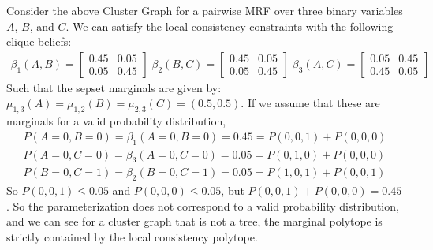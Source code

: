 \documentclass{article}
\begin{document}
\begin{enumerate}[(a)]
    Consider the above Cluster Graph for a pairwise MRF over three binary variables $A$, $B$, and $C$. We can satisfy the local consistency constraints with the following clique beliefs: 
\begin{gather*}
            \beta_{1}(A, B) =
            \begin{bmatrix}
                0.45 & 0.05\\ 0.05 & 0.45
            \end{bmatrix} \;
\beta_{2}(B, C) =
            \begin{bmatrix}
                0.45 & 0.05\\ 0.05 & 0.45
            \end{bmatrix}\;
\beta_{3}(A, C) =
            \begin{bmatrix}
                0.05 & 0.45 \\ 0.45 & 0.05
            \end{bmatrix}
    \end{gather*}
    Such that the sepset marginals are given by: $\mu_{1,3}(A) = \mu_{1,2}(B) = \mu_{2,3}(C) = (0.5, 0.5)$. If we assume that these are marginals for a valid probability distribution, 
    \begin{align*}
        P(A = 0, B = 0) = \beta_1(A = 0, B = 0) = 0.45 = P(0, 0, 1) + P(0, 0, 0) \\[0.5ex]
        P(A = 0, C = 0) = \beta_3(A = 0, C = 0) = 0.05 = P(0, 1, 0) + P(0, 0, 0) \\[0.5ex]
        P(B = 0, C = 1) = \beta_2(B = 0, C = 1) = 0.05 = P(1, 0, 1) + P(0, 0, 1)
    \end{align*}
    So $P(0, 0, 1) \leq 0.05$ and $P(0, 0, 0) \leq 0.05$, but $P(0, 0, 1) + P(0, 0, 0) = 0.45$.
    So the parameterization does not correspond to a valid probability distribution, and we can see for a cluster graph that is not a tree, the marginal polytope is strictly contained by the local consistency polytope. 
\end{enumerate}
\end{document}
